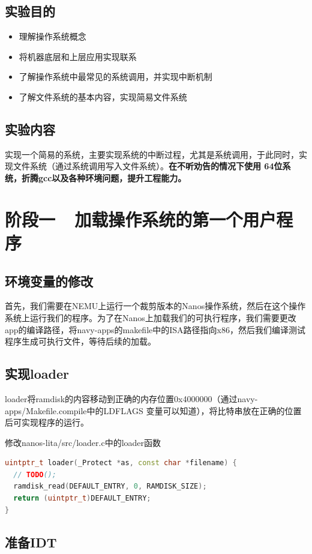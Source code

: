 \documentclass[UTF8,a4paper,10pt]{ctexart}
\begin{document}
\subsection{实验目的}
\begin{itemize}
  \item 理解操作系统概念
  \item 将机器底层和上层应用实现联系
  \item 了解操作系统中最常见的系统调用，并实现中断机制
  \item 了解文件系统的基本内容，实现简易文件系统
  
\end{itemize}
\subsection{实验内容}
实现一个简易的系统，主要实现系统的中断过程，尤其是系统调用，于此同时，实现文件系统（通过系统调用写入文件系统）。\textbf{在不听劝告的情况下使用
64位系统，折腾gcc以及各种环境问题，提升工程能力。}

\section{阶段一\ \ 加载操作系统的第一个用户程序}
\subsection{环境变量的修改}
首先，我们需要在NEMU上运行一个裁剪版本的Nanos操作系统，然后在这个操作系统上运行我们的程序。为了在Nanos上加载我们的可执行程序，我们需要更改app的编译路径，将navy-apps的makefile中的ISA路径指向x86，然后我们编译测试程序生成可执行文件，等待后续的加载。

\subsection{实现loader}
loader将ramdisk的内容移动到正确的内存位置0x4000000（通过navy-apps/Makefile.compile中的LDFLAGS 变量可以知道），将比特串放在正确的位置后可实现程序的运行。

修改nanos-lita/src/loader.c中的loader函数
\begin{lstlisting}[language = C++]
uintptr_t loader(_Protect *as, const char *filename) {
  // TODO();
  ramdisk_read(DEFAULT_ENTRY, 0, RAMDISK_SIZE);
  return (uintptr_t)DEFAULT_ENTRY;
}
\end{lstlisting}
\color{red}{此处出现了第一个离谱的bug，见bug总结/实现loader后出现段错误}
\normalcolor
\subsection{准备IDT}
\end{document}
